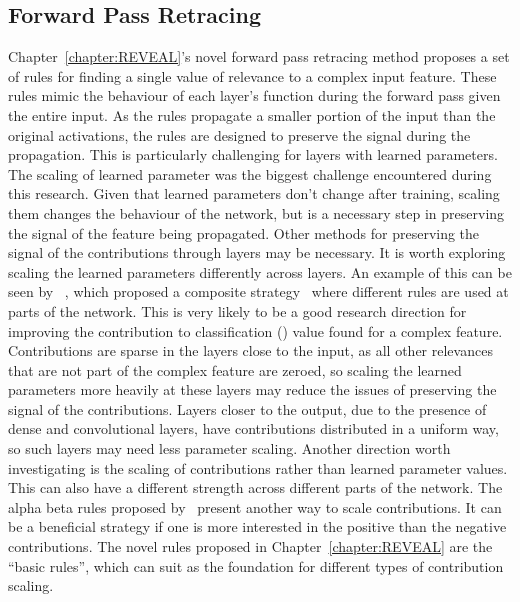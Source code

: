 \subsection{Forward Pass Retracing}
\label{futurectc}
Chapter~\ref{chapter:REVEAL}'s novel forward pass retracing method proposes a set of rules for finding a single value of relevance to a complex input feature. These rules mimic the behaviour of each layer's function during the forward pass given the entire input. As the rules propagate a smaller portion of the input than the original activations, the rules are designed to preserve the signal during the propagation. This is particularly challenging for layers with learned parameters. The scaling of learned parameter was the biggest challenge encountered during this research. Given that learned parameters don't change after training, scaling them changes the behaviour of the network, but is a necessary step in preserving the signal of the feature being propagated. Other methods for preserving the signal of the contributions through layers may be necessary. It is worth exploring scaling the learned parameters differently across layers. An example of this can be seen by \LRP~\cite{bach2015pixel}, which proposed a composite strategy~\cite{SamekBLM17} where different rules are used at parts of the network. This is very likely to be a good research direction for improving the contribution to classification (\CTC) value found for a complex feature. Contributions are sparse in the layers close to the input, as all other relevances that are not part of the complex feature are zeroed, so scaling the learned parameters more heavily at these layers may reduce the issues of preserving the signal of the contributions. Layers closer to the output, due to the presence of dense and convolutional layers, have contributions distributed in a uniform way, so such layers may need less parameter scaling. Another direction worth investigating is the scaling of contributions rather than learned parameter values. This can also have a different strength across different parts of the network. The alpha beta rules proposed by \LRP\ present another way to scale contributions. It can be a beneficial strategy if one is more interested in the positive than the negative contributions. The novel rules proposed in Chapter~\ref{chapter:REVEAL} are the ``basic rules'', which can suit as the foundation for different types of contribution scaling.


